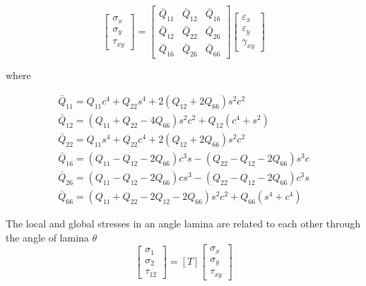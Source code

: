 \documentclass[smallextended]{svjour3}       %
\begin{document}
\begin{equation}
	\left[\begin{array}{l}\sigma_{x} \\ \sigma_{y} \\ \tau_{x
			y}\end{array}\right]=\left[\begin{array}{lll}\bar{Q}_{11} & \bar{Q}_{12} & \bar{Q}_{16}
			\\ \bar{Q}_{12} & \bar{Q}_{22} & \bar{Q}_{26} \\ \bar{Q}_{16} & \bar{Q}_{26} &
			\bar{Q}_{66}\end{array}\right]\left[\begin{array}{l}\varepsilon_{x} \\ \varepsilon_{y}
	\\ \gamma_{x y}\end{array}\right]
\end{equation}

where

\begin{equation}
	\begin{array}{l}
		\bar{Q}_{11}=Q_{11} c^{4}+Q_{22} s^{4}+2\left(Q_{12}+2 Q_{66}\right) s^{2} c^{2}
		\\ 
		\bar{Q}_{12}=\left(Q_{11}+Q_{22}-4 Q_{66}\right) s^{2} c^{2}+Q_{12}\left(c^{4}+s^{2}\right)
		\\ 
		\bar{Q}_{22}=Q_{11} s^{4}+Q_{22} c^{4}+2\left(Q_{12}+2 Q_{66}\right) s^{2} c^{2} \\

		\bar{Q}_{16}=\left(Q_{11}-Q_{12}-2 Q_{66}\right) c^{3} s-\left(Q_{22}-Q_{12}-2
			Q_{66}\right) s^{3} c \\ 
		\bar{Q}_{26}=\left(Q_{11}-Q_{12}-2 Q_{66}\right) c s^{3}-\left(Q_{22}-Q_{12}-2 Q_{66}\right)
		c^{3} s \\ 
		\bar{Q}_{66}=\left(Q_{11}+Q_{22}-2 Q_{12}-2 Q_{66}\right) s^{2}
		c^{2}+Q_{66}\left(s^{4}+c^{4}\right)
	\end{array}
\end{equation}


The local and global stresses in an angle lamina are related to each other through the angle of
lamina $\theta$
\begin{equation}
	\left[\begin{array}{l}\sigma_{1} \\ \sigma_{2} \\ \tau_{12
			}\end{array}\right]=[T]\left[\begin{array}{l}\sigma_{x} \\ \sigma_{y} \\
	\tau_{xy}\end{array}\right]
\end{equation}
\end{document}
